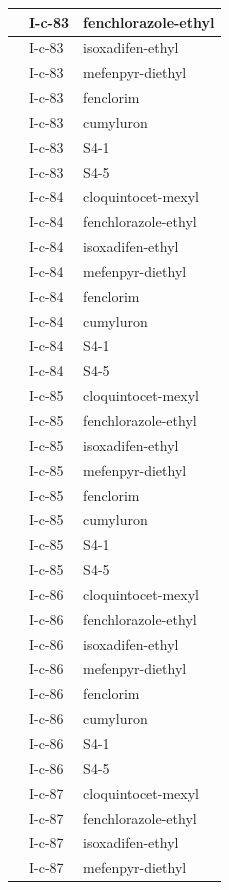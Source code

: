 \documentclass[11pt,a4paper]{article}
\begin{document}
\begin{table}[h]
\begin{tabular}{|l|l|l|}
 & I-c-83 & fenchlorazole-ethyl \\ \hline
 & I-c-83 & isoxadifen-ethyl \\ \hline
 & I-c-83 & mefenpyr-diethyl \\ \hline
 & I-c-83 & fenclorim \\ \hline
 & I-c-83 & cumyluron \\ \hline
 & I-c-83 & S4-1 \\ \hline
 & I-c-83 & S4-5 \\ \hline
 & I-c-84 & cloquintocet-mexyl \\ \hline
 & I-c-84 & fenchlorazole-ethyl \\ \hline
 & I-c-84 & isoxadifen-ethyl \\ \hline
 & I-c-84 & mefenpyr-diethyl \\ \hline
 & I-c-84 & fenclorim \\ \hline
 & I-c-84 & cumyluron \\ \hline
 & I-c-84 & S4-1 \\ \hline
 & I-c-84 & S4-5 \\ \hline
 & I-c-85 & cloquintocet-mexyl \\ \hline
 & I-c-85 & fenchlorazole-ethyl \\ \hline
 & I-c-85 & isoxadifen-ethyl \\ \hline
 & I-c-85 & mefenpyr-diethyl \\ \hline
 & I-c-85 & fenclorim \\ \hline
 & I-c-85 & cumyluron \\ \hline
 & I-c-85 & S4-1 \\ \hline
 & I-c-85 & S4-5 \\ \hline
 & I-c-86 & cloquintocet-mexyl \\ \hline
 & I-c-86 & fenchlorazole-ethyl \\ \hline
 & I-c-86 & isoxadifen-ethyl \\ \hline
 & I-c-86 & mefenpyr-diethyl \\ \hline
 & I-c-86 & fenclorim \\ \hline
 & I-c-86 & cumyluron \\ \hline
 & I-c-86 & S4-1 \\ \hline
 & I-c-86 & S4-5 \\ \hline
 & I-c-87 & cloquintocet-mexyl \\ \hline
 & I-c-87 & fenchlorazole-ethyl \\ \hline
 & I-c-87 & isoxadifen-ethyl \\ \hline
 & I-c-87 & mefenpyr-diethyl \\ \hline

\end{tabular}
\end{table}
\end{document}
